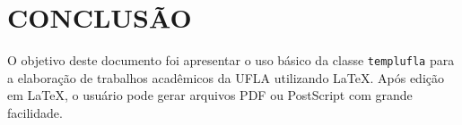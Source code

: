 \chapter{\MakeUppercase{Conclusão}}\label{sec:conclusao}

O objetivo deste documento foi apresentar o uso básico da classe \texttt{templufla} para a elaboração de trabalhos acadêmicos da UFLA utilizando \LaTeX. Após edição em \LaTeX, o usuário pode gerar arquivos PDF \cite{PDF2004} ou PostScript \cite{PostScript1999} com grande facilidade.

